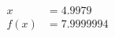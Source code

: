 \documentclass[preview]{standalone}
\begin{document}
\begin{align*}
x &= 4.9979\\f(x) &= 7.9999994
\end{align*}
\end{document}

